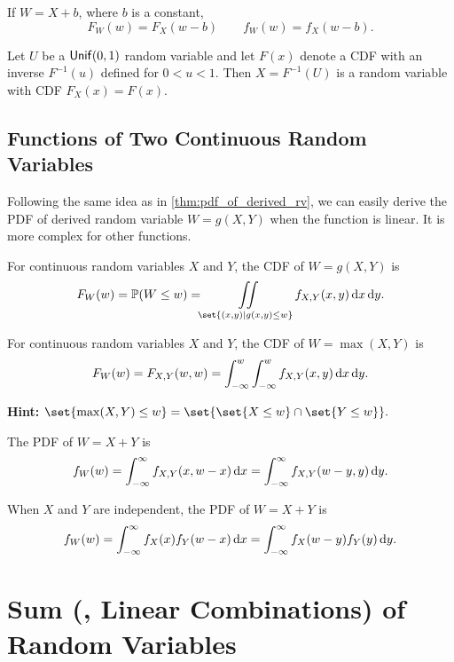 \begin{theorem}
    If $W=X+b$, where $b$ is a constant,
    \[F_W(w)=F_X(w-b) \qquad f_W(w)=f_X(w-b).\]
\end{theorem}

\begin{theorem}
    Let $U$ be a $\mathsf{Unif}(0,1)$ random variable and let $F(x)$ denote a \textnormal{CDF} with an inverse $F^{-1}(u)$ defined for $0<u<1$. Then $X=F^{-1}(U)$ is a random variable with \textnormal{CDF} $F_X(x)=F(x)$.
\end{theorem}

\subsection{Functions of Two Continuous Random Variables}
Following the same idea as in \cref{thm:pdf_of_derived_rv}, we can easily derive the PDF of derived random variable $W=g(X,Y)$ when the function is linear. It is more complex for other functions.

\begin{theorem}
    For continuous random variables $X$ and $Y$, the \textnormal{CDF} of $W=g(X,Y)$ is
    \[F_W(w)=\P{W\leq w}=\iint\limits_{\set{(x,y) \mid g(x,y)\leq w}}f_{X,Y}(x,y)\diff x\diff y.\]
\end{theorem}

\begin{corollary}
    For continuous random variables $X$ and $Y$, the \textnormal{CDF} of $W=\max(X,Y)$ is
    \[F_W(w)=F_{X,Y}(w,w)=\int_{-\infty}^{w}\int_{-\infty}^{w}f_{X,Y}(x,y)\mathop{}\!\mathrm{d} x\mathop{}\!\mathrm{d} y.\]
\end{corollary}
\textbf{Hint:} $\set{\max(X,Y)\leq w}=\set{\set{X\leq w}\cap\set{Y\leq w}}.$

\begin{theorem}
    The \textnormal{PDF} of $W=X+Y$ is
    \[f_W(w)=\int_{-\infty}^{\infty}f_{X,Y}(x,w-x)\mathop{}\!\mathrm{d} x = \int_{-\infty}^{\infty}f_{X,Y}(w-y,y)\mathop{}\!\mathrm{d} y.\]
\end{theorem}

\begin{corollary}
    When $X$ and $Y$ are independent, the \textnormal{PDF} of $W=X+Y$ is
    \[f_W(w)=\int_{-\infty}^{\infty}f_{X}(x)f_Y(w-x)\mathop{}\!\mathrm{d} x = \int_{-\infty}^{\infty}f_{X}(w-y)f_Y(y)\mathop{}\!\mathrm{d} y.\]
\end{corollary}

\section{Sum (\ie, Linear Combinations) of Random Variables}
